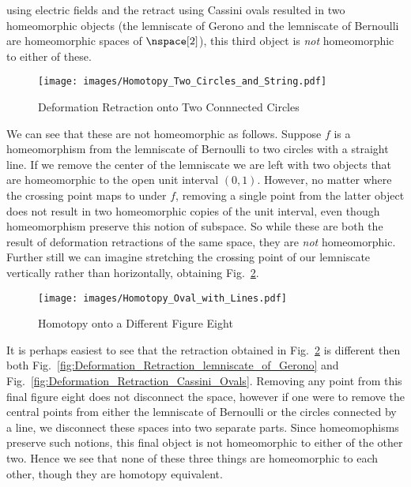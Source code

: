 \documentclass{article}                                                        %
\begin{document}
        using electric fields and the retract using Cassini ovals resulted in
        two homeomorphic objects (the lemniscate of Gerono and the lemniscate
        of Bernoulli are homeomorphic spaces of $\nspace[2]$), this third object
        is \textit{not} homeomorphic to either of these.
        \begin{figure}[H]
            \centering
            \captionsetup{type=figure}
            \texttt{[image: images/Homotopy\_Two\_Circles\_and\_String.pdf]}
            \caption{Deformation Retraction onto Two Connnected Circles}
            \label{fig:Homotopy_Two_Circles_and_String}
        \end{figure}
        We can see that these are not homeomorphic as follows. Suppose $f$ is a
        homeomorphism from the lemniscate of Bernoulli to two circles with a
        straight line. If we remove the center of the lemniscate we are left
        with two objects that are homeomorphic to the open unit interval
        $(0,1)$. However, no matter where the crossing point maps to under $f$,
        removing a single point from the latter object does not result in two
        homeomorphic copies of the unit interval, even though homeomorphism
        preserve this notion of subspace. So while these are both the result of
        deformation retractions of the same space, they are \textit{not}
        homeomorphic. Further still we can imagine stretching the crossing point
        of our lemniscate vertically rather than horizontally, obtaining
        Fig.~\ref{fig:Homotopy_Oval_with_Line}.
        \begin{figure}[H]
            \centering
            \captionsetup{type=figure}
            \texttt{[image: images/Homotopy\_Oval\_with\_Lines.pdf]}
            \caption{Homotopy onto a Different Figure Eight}
            \label{fig:Homotopy_Oval_with_Line}
        \end{figure}
        It is perhaps easiest to see that the retraction obtained in
        Fig.~\ref{fig:Homotopy_Oval_with_Line} is different then both
        Fig.~\ref{fig:Deformation_Retraction_lemniscate_of_Gerono} and
        Fig.~\ref{fig:Deformation_Retraction_Cassini_Ovals}. Removing any point
        from this final figure eight does not disconnect the space, however if
        one were to remove the central points from either the lemniscate of
        Bernoulli or the circles connected by a line, we disconnect these spaces
        into two separate parts. Since homeomophisms preserve such notions, this
        final object is not homeomorphic to either of the other two. Hence we
        see that none of these three things are homeomorphic to each other,
        though they are homotopy equivalent.
\end{document}
